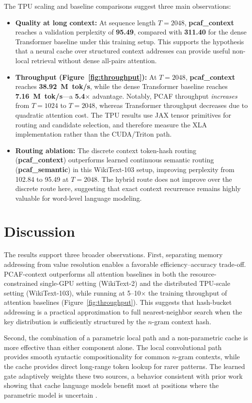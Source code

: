 \documentclass{article}
\begin{document}
The TPU scaling and baseline comparisons suggest three main observations:
\begin{itemize}
  \item \textbf{Quality at long context:} At sequence length $T=2048$, \textbf{pcaf\_context} reaches a validation perplexity of \textbf{95.49}, compared with \textbf{311.40} for the dense Transformer baseline under this training setup. This supports the hypothesis that a neural cache over structured context addresses can provide useful non-local retrieval without dense all-pairs attention.
  \item \textbf{Throughput (Figure~\ref{fig:throughput}):} At $T=2048$, \textbf{pcaf\_context} reaches \textbf{38.92~M~tok/s}, while the dense Transformer baseline reaches \textbf{7.16~M~tok/s}---a \textbf{5.4$\times$} advantage. Notably, PCAF throughput \emph{increases} from $T=1024$ to $T=2048$, whereas Transformer throughput decreases due to quadratic attention cost. The TPU results use JAX tensor primitives for routing and candidate selection, and therefore measure the XLA implementation rather than the CUDA/Triton path.
  \item \textbf{Routing ablation:} The discrete context token-hash routing (\textbf{pcaf\_context}) outperforms learned continuous semantic routing (\textbf{pcaf\_semantic}) in this WikiText-103 setup, improving perplexity from 102.84 to 95.49 at $T=2048$. The hybrid route does not improve over the discrete route here, suggesting that exact context recurrence remains highly valuable for word-level language modeling.
\end{itemize}

\section{Discussion}

The results support three broader observations. First, separating memory
addressing from value resolution enables a favorable efficiency--accuracy
trade-off. PCAF-context outperforms all attention baselines in both the
resource-constrained single-GPU setting (WikiText-2) and the distributed
TPU-scale setting (WikiText-103), while running at 5--10$\times$ the training
throughput of attention baselines (Figure~\ref{fig:throughput}). This suggests
that hash-bucket addressing is a practical approximation to full
nearest-neighbor search when the key distribution is sufficiently structured by
the $n$-gram context hash.

Second, the combination of a parametric local path and a non-parametric cache
is more effective than either component alone. The local convolutional path
provides smooth syntactic compositionality for common $n$-gram contexts, while
the cache provides direct long-range token lookup for rarer patterns. The
learned gate adaptively weights these two sources, a behavior consistent with
prior work showing that cache language models benefit most at positions where
the parametric model is uncertain
\citep{grave2016continuous,khandelwal2019knn}.
\end{document}
